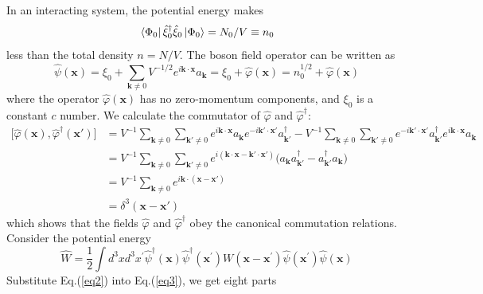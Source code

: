 \documentclass[12pt]{article}
\begin{document}
In an interacting system, the potential energy makes
\begin{equation}
    \bra*{\Phi_0}\hat{\xi}^\dagger_0\hat{\xi}_0\ket*{\Phi_0}=N_0/V\equiv n_0
\end{equation}
less than the total density $n=N/V$. The boson field operator can be written as 
\begin{equation}\label{eq2}
    \hat{\psi}(\mathbf{x})=\xi_0+\sum_{\mathbf{k}\neq 0}V^{-1/2}
    e^{i\mathbf{k}\cdot\mathbf{x}}a_{\mathbf{k}}=\xi_0+\hat{\varphi}(\mathbf{x})
    =n_0^{1/2}+\hat{\varphi}(\mathbf{x})
\end{equation}
where the operator $\hat{\varphi}(\mathbf{x})$ has no zero-momentum components, and 
$\xi_0$ is a constant $c$ number. We calculate the commutator of 
$\hat{\varphi}$ and $\hat{\varphi}^\dagger$:
\begin{equation}\label{commutator}
    \begin{split}
        \big[\hat{\varphi}(\mathbf{x}),\hat{\varphi}^\dagger(\mathbf{x}')\big]&=V^{-1}
        \sum_{\mathbf{k}\neq 0}\sum_{\mathbf{k}'\neq 0}e^{i\mathbf{k}\cdot\mathbf{x}}
        a_{\mathbf{k}}e^{-i\mathbf{k}'\cdot\mathbf{x}'}a^\dagger_{\mathbf{k}'}
        -V^{-1}\sum_{\mathbf{k}\neq 0}\sum_{\mathbf{k}'\neq 0}e^{-i\mathbf{k}'\cdot\mathbf{x}'}
        a^\dagger_{\mathbf{k}'}e^{i\mathbf{k}\cdot\mathbf{x}}a_{\mathbf{k}}\\
        &=V^{-1}\sum_{\mathbf{k}\neq 0}\sum_{\mathbf{k}'\neq 0}e^{i(\mathbf{k}\cdot\mathbf{x}
        -\mathbf{k}'\cdot\mathbf{x}')}\big(a_{\mathbf{k}}a^\dagger_{\mathbf{k}'}-
        a^\dagger_{\mathbf{k}'}a_{\mathbf{k}}\big)\\
        &=V^{-1}\sum_{\mathbf{k}\neq 0}e^{i\mathbf{k}\cdot(\mathbf{x}-\mathbf{x}')}\\
        &=\delta^3(\mathbf{x}-\mathbf{x}')
    \end{split}
\end{equation}
which shows that the fields $\hat{\varphi}$ and $\hat{\varphi}^\dagger$ obey the 
canonical commutation relations.
Consider the potential energy
\begin{equation}\label{eq3}
    \hat{W}=\frac{1}{2}\int d^{3}xd^{3}x^{\prime}\hat{\psi}^\dagger(\mathbf{x})
    \hat{\psi}^\dagger\left(\mathbf{x}^{\prime}\right)W\left(\mathbf{x}-
    \mathbf{x}^{\prime}\right)\hat{\psi}\left(\mathbf{x}^{\prime}\right)\hat{\psi}
    (\mathbf{x})
\end{equation}
Substitute Eq.(\ref{eq2}) into Eq.(\ref{eq3}), we get eight parts 
\end{document}
